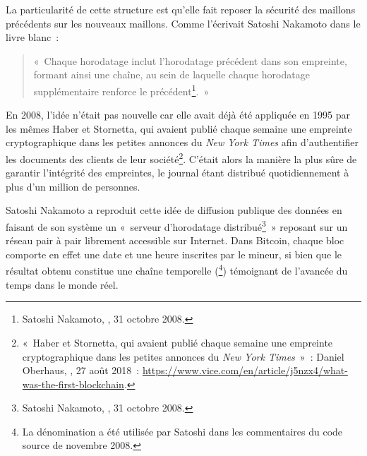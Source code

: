 La particularité de cette structure est qu'elle fait reposer la sécurité des maillons précédents sur les nouveaux maillons. Comme l'écrivait Satoshi Nakamoto dans le livre blanc~: 

\begin{quote}
«~Chaque horodatage inclut l'horodatage précédent dans son empreinte, formant ainsi une chaîne, au sein de laquelle chaque horodatage supplémentaire renforce le précédent\footnote{Satoshi Nakamoto, , 31 octobre 2008.}.~»
\end{quote}

En 2008, l'idée n'était pas nouvelle car elle avait déjà été appliquée en 1995 par les mêmes Haber et Stornetta, qui avaient publié chaque semaine une empreinte cryptographique dans les petites annonces du \emph{New York Times} afin d'authentifier les documents des clients de leur société\footnote{«~Haber et Stornetta, qui avaient publié chaque semaine une empreinte cryptographique dans les petites annonces du \emph{New York Times}~»~: Daniel Oberhaus, , 27 août 2018~: \url{https://www.vice.com/en/article/j5nzx4/what-was-the-first-blockchain}.}. C'était alors la manière la plus sûre de garantir l'intégrité des empreintes, le journal étant distribué quotidiennement à plus d'un million de personnes.


Satoshi Nakamoto a reproduit cette idée de diffusion publique des données en faisant de son système un «~serveur d'horodatage distribué\footnote{Satoshi Nakamoto, , 31 octobre 2008.}~» reposant sur un réseau pair à pair librement accessible sur Internet. Dans Bitcoin, chaque bloc comporte en effet une date et une heure inscrites par le mineur, si bien que le résultat obtenu constitue une chaîne temporelle (\footnote{La dénomination  a été utilisée par Satoshi dans les commentaires du code source de novembre 2008.}) témoignant de l'avancée du temps dans le monde réel.

